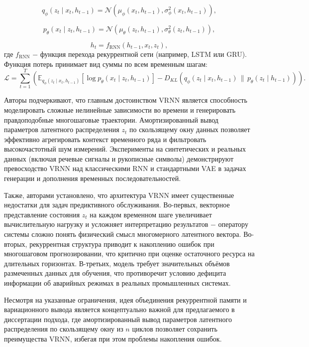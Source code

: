 \documentclass[14pt, a4paper, oneside]{extreport}
\begin{document}
\begin{equation}
q_\phi(z_t \mid x_t, h_{t-1}) = \mathcal{N}\left(\mu_\phi(x_t, h_{t-1}), \sigma_\phi^2(x_t, h_{t-1})\right),
\end{equation}

\begin{equation}
p_\theta(x_t \mid z_t, h_{t-1}) = \mathcal{N}\left(\mu_\theta(z_t, h_{t-1}), \sigma_\theta^2(z_t, h_{t-1})\right),
\end{equation}

\begin{equation}
h_t = f_{\text{RNN}}(h_{t-1}, x_t, z_t),
\end{equation}
где $f_{\text{RNN}}$ $-$ функция перехода рекуррентной сети (например, LSTM или GRU). Функция потерь принимает вид суммы по всем временным шагам:
\begin{equation}
\mathcal{L} = \sum_{t=1}^{T} \left( \mathbb{E}_{q_\phi(z_t \mid x_t, h_{t-1})}\left[\log p_\theta(x_t \mid z_t, h_{t-1})\right] - D_{KL}\left(q_\phi(z_t \mid x_t, h_{t-1}) \,\|\, p_\theta(z_t \mid h_{t-1})\right) \right).
\end{equation}

Авторы подчеркивают, что главным достоинством VRNN является способность моделировать сложные нелинейные зависимости во времени и генерировать правдоподобные многошаговые траектории. Амортизированный вывод параметров латентного распределения $z_t$ по скользящему окну данных позволяет эффективно агрегировать контекст временного ряда и фильтровать высокочастотный шум измерений. Эксперименты на синтетических и реальных данных (включая речевые сигналы и рукописные символы) демонстрируют превосходство VRNN над классическими RNN и стандартными VAE в задачах генерации и дополнения временных последовательностей.

Также, авторами установлено, что архитектура VRNN имеет существенные недостатки для задач предиктивного обслуживания. Во-первых, векторное представление состояния $z_t$ на каждом временном шаге увеличивает вычислительную нагрузку и усложняет интерпретацию результатов $-$ оператору системы сложно понять физический смысл многомерного латентного вектора. Во-вторых, рекуррентная структура приводит к накоплению ошибок при многошаговом прогнозировании, что критично при оценке остаточного ресурса на длительных горизонтах. В-третьих, модель требует значительных объёмов размеченных данных для обучения, что противоречит условию дефицита информации об аварийных режимах в реальных промышленных системах.

Несмотря на указанные ограничения, идея объединения рекуррентной памяти и вариационного вывода является концептуально важной для предлагаемого в диссертации подхода, где амортизированный вывод параметров латентного распределения по скользящему окну из $n$ циклов позволяет сохранить преимущества VRNN, избегая при этом проблемы накопления ошибок.
\end{document}
